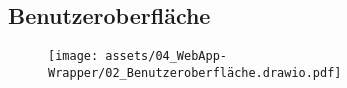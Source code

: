 \subsection{Benutzeroberfläche}

\begin{figure}[H]
    \centering
    \texttt{[image: assets/04\_WebApp-Wrapper/02\_Benutzeroberfläche.drawio.pdf]}
\end{figure}


\clearpage
